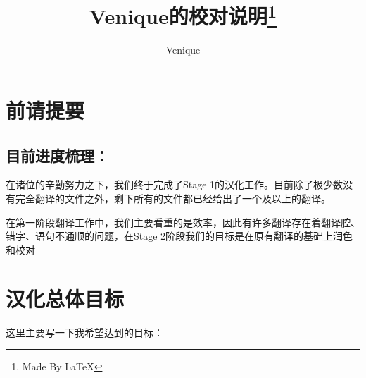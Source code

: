 \documentclass[10pt,a4paper,UTF8]{article}
\begin{document}
    \setlength{\parindent}{2em}                        %
    \renewcommand{\baselinestretch}{1.5}\normalsize    %

    \renewcommand*{\qedsymbol}{[证毕]}                 %
    \newcommand{\HEI}{\CJKfamily{hei}}                 %
    \newcommand{\KAI}{\CJKfamily{kai}}                 %

    \newcommand{\romannum}[1]{\expandafter{\romannumeral#1}}    %

    \newtheorem{instance}{}[section]

    \begin{titlepage}
        \title{Venique的校对说明\footnote{Made By \LaTeX}}
        \author{Venique}


        \maketitle
        \thispagestyle{empty}
        
        \vspace{0.55\textheight}
        
    \end{titlepage}

    \newpage

    \pagestyle{fancy}
    \rfoot{\thepage} 
    \cfoot{}
    \section{前请提要}
    	\subsection{目前进度梳理：}
    		在诸位的辛勤努力之下，我们终于完成了Stage 1的汉化工作。目前除了极少数没有完全翻译的文件之外，剩下所有的文件都已经给出了一个及以上的翻译。

    		在第一阶段翻译工作中，我们主要看重的是效率，因此有许多翻译存在着翻译腔、错字、语句不通顺的问题，在Stage 2阶段我们的目标是在原有翻译的基础上润色和校对

    \section{汉化总体目标}
    	这里主要写一下我希望达到的目标：
    	
\end{document}

